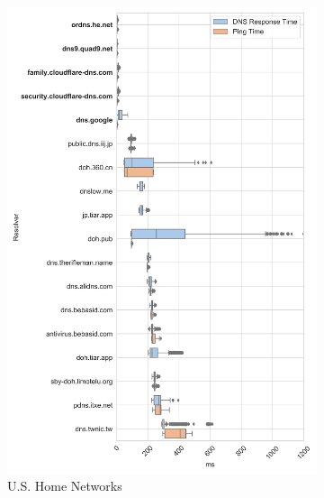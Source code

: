 \begin{figure}[t!]
\centering
%
\begin{subfigure}[b]{0.4\textwidth}
\includegraphics[width=\textwidth]{figures/poah_asia.png}
\caption{U.S. Home Networks}
\label{fig:subfiga}
\end{subfigure}
%
\begin{subfigure}[b]{0.4\textwidth}

\end{subfigure}
\end{figure}

